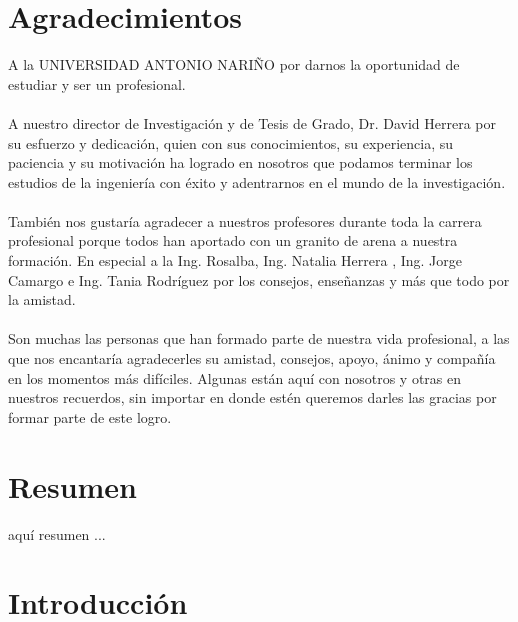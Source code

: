 \documentclass[a4paper,openright,12pt]{book}
\theoremstyle{definition}
\theoremstyle{remark}
\begin{document}
\chapter*{Agradecimientos}
A la UNIVERSIDAD ANTONIO NARIÑO por darnos la oportunidad de estudiar y ser
un profesional.\\\\
A nuestro director de Investigación y de Tesis de Grado, Dr. David Herrera por su esfuerzo y dedicación, quien con sus conocimientos, su experiencia, su paciencia y su motivación ha logrado en nosotros que podamos terminar los estudios de la ingeniería con éxito y adentrarnos en el mundo de la investigación.\\\\
También nos gustaría agradecer a nuestros profesores durante toda la carrera profesional porque todos han aportado con un granito de arena a nuestra formación. En especial a  la Ing. Rosalba, Ing. Natalia Herrera , Ing. Jorge Camargo e Ing. Tania Rodríguez  por los consejos, enseñanzas y más que todo por la amistad.\\\\
Son muchas las personas que han formado parte de nuestra vida profesional, a
las que nos encantaría agradecerles su amistad, consejos, apoyo, ánimo y
compañía en los momentos más difíciles. Algunas están aquí
con nosotros y otras en nuestros recuerdos, sin importar en donde
estén queremos darles las gracias por formar parte de este logro.

\chapter*{Resumen}
aquí resumen ...
\tableofcontents %
\clearpage

\listoffigures %

\clearpage
{} %
\listoftables %

\chapter*{Introducción}
\end{document}
